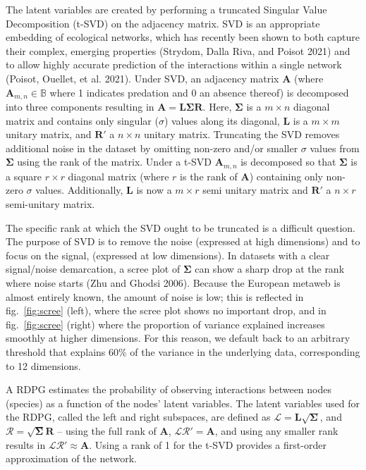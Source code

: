 \documentclass[10pt,oneside]{article}
\begin{document}
The latent variables are created by performing a truncated Singular
Value Decomposition (t-SVD) on the adjacency matrix. SVD is an
appropriate embedding of ecological networks, which has recently been
shown to both capture their complex, emerging properties (Strydom, Dalla
Riva, and Poisot 2021) and to allow highly accurate prediction of the
interactions within a single network (Poisot, Ouellet, et al. 2021).
Under SVD, an adjacency matrix \(\mathbf{A}\) (where
\(\mathbf{A}_{m,n}\in\mathbb{B}\) where 1 indicates predation and 0 an
absence thereof) is decomposed into three components resulting in
\(\mathbf{A} = \mathbf{L}\mathbf{\Sigma}\mathbf{R}.\) Here,
\(\mathbf{\Sigma}\) is a \(m \times n\) diagonal matrix and contains
only singular (\(\sigma\)) values along its diagonal, \(\mathbf{L}\) is
a \(m \times m\) unitary matrix, and \(\mathbf{R}'\) a \(n \times n\)
unitary matrix. Truncating the SVD removes additional noise in the
dataset by omitting non-zero and/or smaller \(\sigma\) values from
\(\mathbf{\Sigma}\) using the rank of the matrix. Under a t-SVD
\(\mathbf{A}_{m,n}\) is decomposed so that \(\mathbf{\Sigma}\) is a
square \(r \times r\) diagonal matrix (where \(r\) is the rank of
\(\mathbf{A}\)) containing only non-zero \(\sigma\) values.
Additionally, \(\mathbf{L}\) is now a \(m \times r\) semi unitary matrix
and \(\mathbf{R}'\) a \(n \times r\) semi-unitary matrix.

The specific rank at which the SVD ought to be truncated is a difficult
question. The purpose of SVD is to remove the noise (expressed at high
dimensions) and to focus on the signal, (expressed at low dimensions).
In datasets with a clear signal/noise demarcation, a scree plot of
\(\mathbf{\Sigma}\) can show a sharp drop at the rank where noise starts
(Zhu and Ghodsi 2006). Because the European metaweb is almost entirely
known, the amount of noise is low; this is reflected in
fig.~\ref{fig:scree} (left), where the scree plot shows no important
drop, and in fig.~\ref{fig:scree} (right) where the proportion of
variance explained increases smoothly at higher dimensions. For this
reason, we default back to an arbitrary threshold that explains 60\% of
the variance in the underlying data, corresponding to 12 dimensions.

A RDPG estimates the probability of observing interactions between nodes
(species) as a function of the nodes' latent variables. The latent
variables used for the RDPG, called the left and right subspaces, are
defined as \(\mathcal{L} = \mathbf{L}\sqrt{\mathbf{\Sigma}}\), and
\(\mathcal{R} = \sqrt{\mathbf{\Sigma}}\mathbf{R}\) -- using the full
rank of \(\mathbf{A}\), \(\mathcal{L}\mathcal{R}' = \mathbf{A}\), and
using any smaller rank results in
\(\mathcal{L}\mathcal{R}' \approx \mathbf{A}\). Using a rank of 1 for
the t-SVD provides a first-order approximation of the network.
\end{document}
